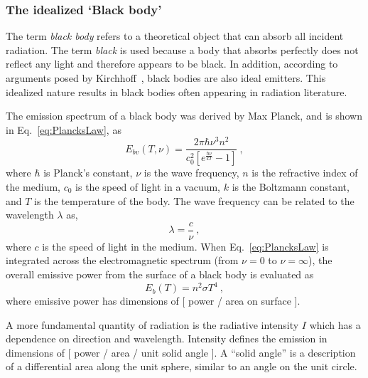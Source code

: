 \subsubsection{The idealized `Black body'}
The term \textit{black body} refers to a theoretical object that can absorb all incident radiation. The term \textit{black} is used because a body that absorbs perfectly does not reflect any light and therefore appears to be black. In addition, according to arguments posed by Kirchhoff~\cite{Modest2013RadiativeTransfer}, black bodies are also ideal emitters.
This idealized nature results in black bodies often appearing in radiation literature.

The emission spectrum of a black body was derived by Max Planck, and is shown in Eq.~\ref{eq:PlancksLaw}, as
\begin{equation}
    E_{bv}(T,\nu{}) = \frac{2\pi{}\hbar\nu{}^3n^2}{c_0^2\left[e^\frac{\hbar\nu{}}{kT}-1\right]}\ ,
    \label{eq:PlancksLaw}
\end{equation}
where $\hbar$ is Planck's constant, $\nu{}$ is the wave frequency, $n$ is the refractive index of the medium, $c_0$ is the speed of light in a vacuum, $k$ is the Boltzmann constant, and $T$ is the temperature of the body. The wave frequency can be related to the wavelength $\lambda$ as,
\begin{equation}
    \lambda{}=\frac{c}{\nu}\ ,
    \label{eq:FrequencyToWavelength}
\end{equation}
where $c$ is the speed of light in the medium. When Eq.~\ref{eq:PlancksLaw} is integrated across the electromagnetic spectrum (from $\nu=0$ to $\nu=\infty$), the overall emissive power from the surface of a black body is evaluated as
\begin{equation}
    E_b(T) = n^2\sigma{}T^4\ ,
    \label{eq:PlancksLawIntegrated}
\end{equation}
where emissive power has dimensions of [ power / area on surface ]. 

A more fundamental quantity of radiation is the radiative intensity $I$ which has a dependence on direction and wavelength. Intensity defines the emission in dimensions of [ power / area / unit solid angle ]. %
A ``solid angle'' is a description of a differential area along the unit sphere, similar to an angle on the unit circle.

